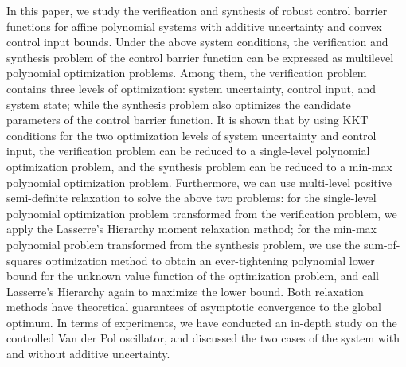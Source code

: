 \begin{abstract*}
  In this paper, we study the verification and synthesis of robust control barrier functions for affine polynomial systems with additive uncertainty and convex control input bounds. Under the above system conditions, the verification and synthesis problem of the control barrier function can be expressed as multilevel polynomial optimization problems. Among them, the verification problem contains three levels of optimization: system uncertainty, control input, and system state; while the synthesis problem also optimizes the candidate parameters of the control barrier function. It is shown that by using KKT conditions for the two optimization levels of system uncertainty and control input, the verification problem can be reduced to a single-level polynomial optimization problem, and the synthesis problem can be reduced to a min-max polynomial optimization problem. Furthermore, we can use multi-level positive semi-definite relaxation to solve the above two problems: for the single-level polynomial optimization problem transformed from the verification problem, we apply the Lasserre's Hierarchy moment relaxation method; for the min-max polynomial problem transformed from the synthesis problem, we use the sum-of-squares optimization method to obtain an ever-tightening polynomial lower bound for the unknown value function of the optimization problem, and call Lasserre's Hierarchy again to maximize the lower bound. Both relaxation methods have theoretical guarantees of asymptotic convergence to the global optimum. In terms of experiments, we have conducted an in-depth study on the controlled Van der Pol oscillator, and discussed the two cases of the system with and without additive uncertainty.

\end{abstract*}
